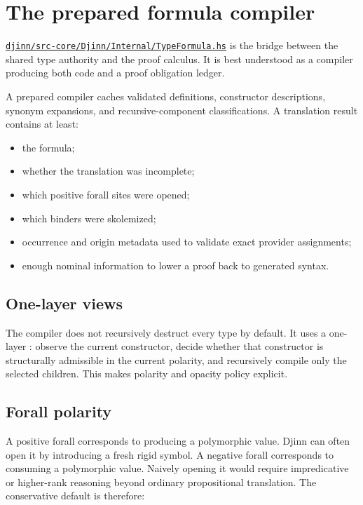 \documentclass[10pt,letterpaper,oneside]{report}
\newcommand{\code}[1]{\texttt{\detokenize{#1}}}
\def\DjexBase{https://github.com/VladimirReshetnikov/Djex/blob/d3d9662598460316bdcd177ce6768c521e764aa8/}
\newcommand{\dpath}[1]{\href{\DjexBase#1}{\nolinkurl{#1}}}
\begin{document}
\section{The prepared formula compiler}\label{sec:djinn-compiler}

\dpath{djinn/src-core/Djinn/Internal/TypeFormula.hs} is the bridge between the shared type authority and the proof calculus. It is best understood as a compiler producing both code and a proof obligation ledger.

A prepared compiler caches validated definitions, constructor descriptions, synonym expansions, and recursive-component classifications. A translation result contains at least:

\begin{itemize}
  \item the formula;
  \item whether the translation was incomplete;
  \item which positive forall sites were opened;
  \item which binders were skolemized;
  \item occurrence and origin metadata used to validate exact provider assignments;
  \item enough nominal information to lower a proof back to generated syntax.
\end{itemize}

\subsection{One-layer views}

The compiler does not recursively destruct every type by default. It uses a one-layer \code{TypeView}: observe the current constructor, decide whether that constructor is structurally admissible in the current polarity, and recursively compile only the selected children. This makes polarity and opacity policy explicit.

\subsection{Forall polarity}

A positive forall corresponds to producing a polymorphic value. Djinn can often open it by introducing a fresh rigid symbol. A negative forall corresponds to consuming a polymorphic value. Naively opening it would require impredicative or higher-rank reasoning beyond ordinary propositional translation. The conservative default is therefore:
\end{document}
